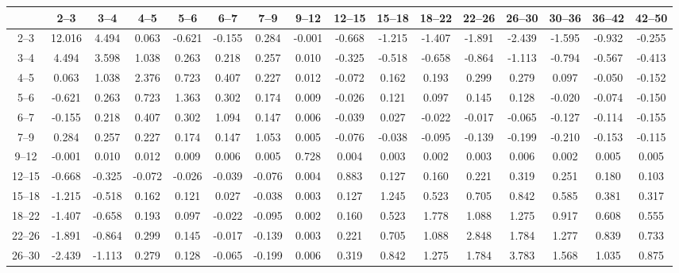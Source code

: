\begin{table}[tb]
    {\renewcommand{\tabcolsep}{0.1cm} \begin{tabular}{c|ccccccccccccccc}
    \hline
           &   2--3 &   3--4 &   4--5 &   5--6 &   6--7 &   7--9 &  9--12 & 12--15 & 15--18 & 18--22 & 22--26 & 26--30 & 30--36 & 36--42 & 42--50 \\
    \hline
    2--3   & 12.016 &  4.494 &  0.063 & -0.621 & -0.155 &  0.284 & -0.001 & -0.668 & -1.215 & -1.407 & -1.891 & -2.439 & -1.595 & -0.932 & -0.255 \\
    3--4   &  4.494 &  3.598 &  1.038 &  0.263 &  0.218 &  0.257 &  0.010 & -0.325 & -0.518 & -0.658 & -0.864 & -1.113 & -0.794 & -0.567 & -0.413 \\
    4--5   &  0.063 &  1.038 &  2.376 &  0.723 &  0.407 &  0.227 &  0.012 & -0.072 &  0.162 &  0.193 &  0.299 &  0.279 &  0.097 & -0.050 & -0.152 \\
    5--6   & -0.621 &  0.263 &  0.723 &  1.363 &  0.302 &  0.174 &  0.009 & -0.026 &  0.121 &  0.097 &  0.145 &  0.128 & -0.020 & -0.074 & -0.150 \\
    6--7   & -0.155 &  0.218 &  0.407 &  0.302 &  1.094 &  0.147 &  0.006 & -0.039 &  0.027 & -0.022 & -0.017 & -0.065 & -0.127 & -0.114 & -0.155 \\
    7--9   &  0.284 &  0.257 &  0.227 &  0.174 &  0.147 &  1.053 &  0.005 & -0.076 & -0.038 & -0.095 & -0.139 & -0.199 & -0.210 & -0.153 & -0.115 \\
    9--12  & -0.001 &  0.010 &  0.012 &  0.009 &  0.006 &  0.005 &  0.728 &  0.004 &  0.003 &  0.002 &  0.003 &  0.006 &  0.002 &  0.005 &  0.005 \\
    12--15 & -0.668 & -0.325 & -0.072 & -0.026 & -0.039 & -0.076 &  0.004 &  0.883 &  0.127 &  0.160 &  0.221 &  0.319 &  0.251 &  0.180 &  0.103 \\
    15--18 & -1.215 & -0.518 &  0.162 &  0.121 &  0.027 & -0.038 &  0.003 &  0.127 &  1.245 &  0.523 &  0.705 &  0.842 &  0.585 &  0.381 &  0.317 \\
    18--22 & -1.407 & -0.658 &  0.193 &  0.097 & -0.022 & -0.095 &  0.002 &  0.160 &  0.523 &  1.778 &  1.088 &  1.275 &  0.917 &  0.608 &  0.555 \\
    22--26 & -1.891 & -0.864 &  0.299 &  0.145 & -0.017 & -0.139 &  0.003 &  0.221 &  0.705 &  1.088 &  2.848 &  1.784 &  1.277 &  0.839 &  0.733 \\
    26--30 & -2.439 & -1.113 &  0.279 &  0.128 & -0.065 & -0.199 &  0.006 &  0.319 &  0.842 &  1.275 &  1.784 &  3.783 &  1.568 &  1.035 &  0.875 \\

\end{tabular}}
\end{table}
